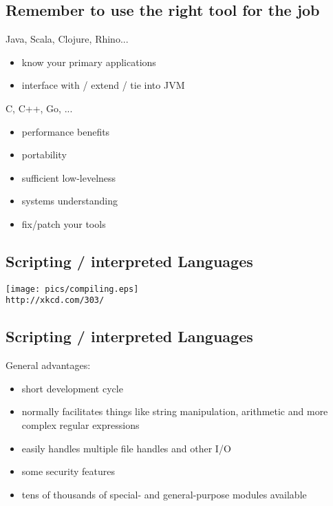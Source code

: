 \documentclass[xga]{xdvislides}
\begin{document}
\subsection{Remember to use the right tool for the job}
Java, Scala, Clojure, Rhino...
\begin{itemize}
	\item know your primary applications
	\item interface with / extend / tie into JVM
\end{itemize}
\vspace{.5in}
C, C++, Go, ...
\begin{itemize}
	\item performance benefits
	\item portability
	\item sufficient low-levelness
	\item systems understanding
	\item fix/patch your tools
\end{itemize}

\subsection{Scripting / interpreted Languages}
\vspace*{\fill}
\begin{center}
	\texttt{[image: pics/compiling.eps]}
	\\
	\small \verb+http://xkcd.com/303/+
\end{center}
\vspace*{\fill}


\subsection{Scripting / interpreted Languages}
General advantages:
\begin{itemize}
	\item short development cycle
	\item normally facilitates things like string manipulation,
		arithmetic and more complex regular expressions
	\item easily handles multiple file handles and other I/O
	\item some security features
	\item tens of thousands of special- and general-purpose modules
		available
\end{itemize}
\end{document}
